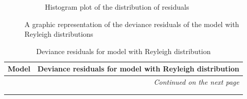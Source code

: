 \documentclass[12pt,a4paper,twoside]{article}
\begin{document}
\begin{figure}[!ht]
\begin{subfigure}{.45\textwidth}
        \caption{Histogram plot of the distribution of residuals}
        \label{fig:reyleighdeviancehist}
    \end{subfigure}
    \caption{A graphic representation of the deviance residuals of the model with Reyleigh distributions}
    \label{fig:reyleighdeviancefig}
\end{figure}

\begin{longtable}{l|p{}|p{}}
	\textbf{Model} & \multicolumn{2}{r}{Deviance residuals for model with Reyleigh distribution} \\
	\hline
	\endhead
	\hline
	\multicolumn{3}{r}{\emph{Continued on the next page}}    \\
	\endfoot
	\hline
	\endlastfoot
	\hline
	 &  &  \\
	 \caption{Deviance residuals for model with Reyleigh distribution}
	 \label{tab:reyleighdeviancetab}
\end{longtable}
\end{document}
